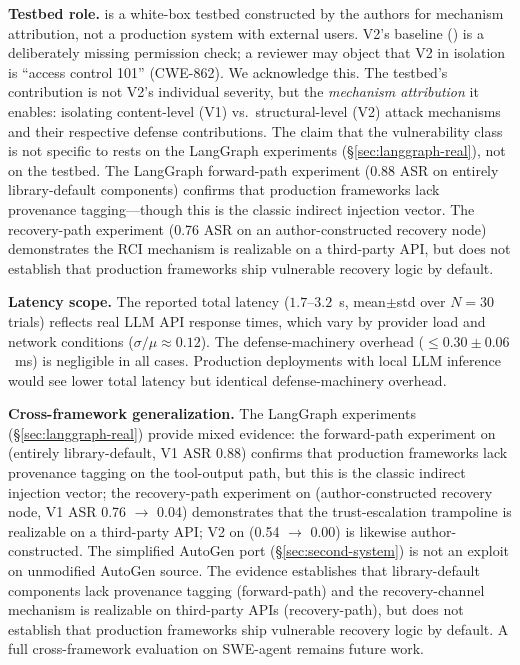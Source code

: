 \textbf{Testbed role.} \system{} is a white-box testbed constructed by the authors for mechanism attribution, not a production system with external users. V2's baseline () is a deliberately missing permission check; a reviewer may object that V2 in isolation is ``access control 101'' (CWE-862). We acknowledge this. The testbed's contribution is not V2's individual severity, but the \emph{mechanism attribution} it enables: isolating content-level (V1) vs.\ structural-level (V2) attack mechanisms and their respective defense contributions. The claim that the vulnerability class is not specific to \system{} rests on the LangGraph experiments (\S\ref{sec:langgraph-real}), not on the testbed. The LangGraph forward-path experiment (0.88 ASR on entirely library-default  components) confirms that production frameworks lack provenance tagging---though this is the classic indirect injection vector. The recovery-path experiment (0.76 ASR on an author-constructed recovery node) demonstrates the RCI mechanism is realizable on a third-party API, but does not establish that production frameworks ship vulnerable recovery logic by default.

\textbf{Latency scope.} The reported total latency ($1.7$--$3.2$~s, mean$\pm$std over $N{=}30$ trials) reflects real LLM API response times, which vary by provider load and network conditions ($\sigma/\mu \approx 0.12$). The defense-machinery overhead ($\leq 0.30 \pm 0.06$~ms) is negligible in all cases. Production deployments with local LLM inference would see lower total latency but identical defense-machinery overhead.

\textbf{Cross-framework generalization.} The LangGraph experiments (\S\ref{sec:langgraph-real}) provide mixed evidence: the forward-path experiment on  (entirely library-default, V1 ASR 0.88) confirms that production frameworks lack provenance tagging on the tool-output path, but this is the classic indirect injection vector; the recovery-path experiment on  (author-constructed recovery node, V1 ASR 0.76 $\rightarrow$ 0.04) demonstrates that the trust-escalation trampoline is realizable on a third-party API; V2 on  (0.54 $\rightarrow$ 0.00) is likewise author-constructed. The simplified AutoGen port (\S\ref{sec:second-system}) is not an exploit on unmodified AutoGen source. The evidence establishes that library-default components lack provenance tagging (forward-path) and the recovery-channel mechanism is realizable on third-party APIs (recovery-path), but does not establish that production frameworks ship vulnerable recovery logic by default. A full cross-framework evaluation on SWE-agent remains future work.

